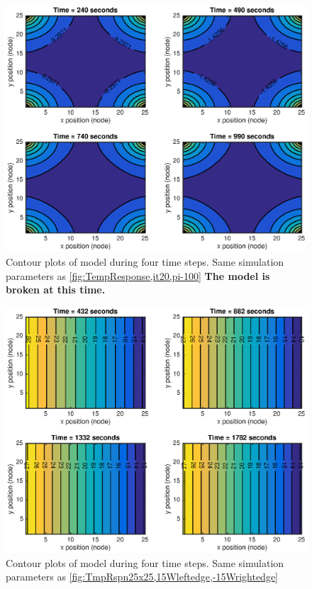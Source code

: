 \documentclass[10pt,twocolumn]{article}
\begin{document}
\begin{figure}
	\center
	\includegraphics[width=0.8\linewidth]{ContourTrans,it20,pi-100.eps}
	\caption{Contour plots of model during four time steps. Same simulation parameters as \autoref{fig:TempResponse,it20,pi-100} \textbf{The model is broken at this time.}}
	\label{fig:ContourTrans,it20,pi-100}
\end{figure}


\begin{figure}
	\center
	\includegraphics[width=0.8\linewidth]{CtrTnst25x25,15Wleftedge,-15Wrightedge.eps}
	\caption{Contour plots of model during four time steps. Same simulation parameters as \autoref{fig:TmpRspn25x25,15Wleftedge,-15Wrightedge}}
	\label{fig:CtrTnst25x25,15Wleftedge,-15Wrightedge}
\end{figure}
\end{document}
